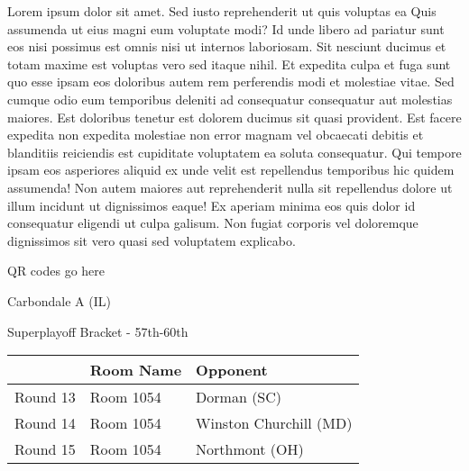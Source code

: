 \documentclass{article}%
\begin{document}
\vspace*{8pt}%
\linebreak%
\newline%
\newline%
Lorem ipsum dolor sit amet. Sed iusto reprehenderit ut quis voluptas ea Quis assumenda ut eius magni eum voluptate modi? Id unde libero ad pariatur sunt eos nisi possimus est omnis nisi ut internos laboriosam. Sit nesciunt ducimus et totam maxime est voluptas vero sed itaque nihil. Et expedita culpa et fuga sunt quo esse ipsam eos doloribus autem rem perferendis modi et molestiae vitae.\newline%
\newline%
Sed cumque odio eum temporibus deleniti ad consequatur consequatur aut molestias maiores. Est doloribus tenetur est dolorem ducimus sit quasi provident. Est facere expedita non expedita molestiae non error magnam vel obcaecati debitis et blanditiis reiciendis est cupiditate voluptatem ea soluta consequatur. Qui tempore ipsam eos asperiores aliquid ex unde velit est repellendus temporibus hic quidem assumenda!\newline%
\newline%
Non autem maiores aut reprehenderit nulla sit repellendus dolore ut illum incidunt ut dignissimos eaque! Ex aperiam minima eos quis dolor id consequatur eligendi ut culpa galisum. Non fugiat corporis vel doloremque dignissimos sit vero quasi sed voluptatem explicabo.\newline%
\newline%
%
\vspace*{30pt}%
\begin{center}%
\begin{Huge}%
QR codes go here%
\end{Huge}%
\end{center}%
\newpage%
\begin{center}%
\begin{Huge}%
Carbondale A (IL)%
\end{Huge}%
\vspace*{8pt}%
\linebreak%
\begin{Large}%
Superplayoff Bracket {-} 57th{-}60th%
\end{Large}%
\end{center}%
%
\begin{tabularx}{\textwidth}{|c|Y|Y|}%
\hline%
&Room Name&Opponent\\%
\hline%
Round 13&Room 1054&Dorman (SC)\\%
Round 14&Room 1054&Winston Churchill (MD)\\%
Round 15&Room 1054&Northmont (OH)\\%
\hline%
\end{tabularx}%
\end{document}
